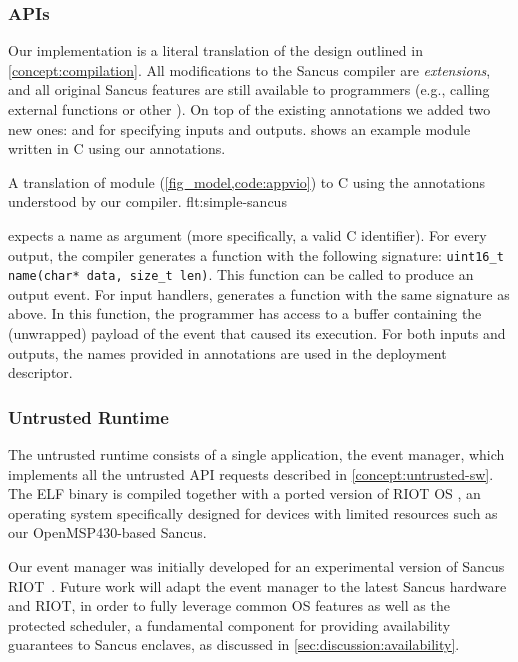 \subsubsection{APIs}
% 
\label{impl:sancus-CompilerAndAPIs}

Our implementation is a literal translation of the design outlined in
\cref{concept:compilation}. All modifications to the Sancus compiler are
\emph{extensions}, and all original Sancus features are still available to
programmers (e.g., calling external functions or other \protmods).
%
On top of the existing annotations we added two new ones: \sminput{} and
\smoutput{} for specifying inputs and outputs.  shows an
example module written in C using our annotations.

%
  {A translation of module  (\cref{fig_model,code:appvio}) to C
using the annotations understood by our compiler.}%
  {flt:simple-sancus}

\smoutput{} expects a name as argument (more specifically, a valid C
identifier).  For every output, the compiler generates a function with the
following signature: \texttt{uint16\_t name(char* data, size\_t len)}.  This
function can be called to produce an output event.  For input handlers,
\sminput{} generates a function with the same signature as above.  In this
function, the programmer has access to a buffer containing the (unwrapped)
payload of the event that caused its execution.  For both inputs and outputs,
the names provided in annotations are used in the deployment descriptor.

\subsubsection{Untrusted Runtime}
%
The untrusted runtime consists of a single application, the event manager, which
implements all the untrusted API requests described in
\cref{concept:untrusted-sw}. The ELF binary is compiled together with a ported
version of RIOT OS \cite{baccelli2013riot}, an operating system specifically
designed for devices with limited resources such as our OpenMSP430-based Sancus.

Our event manager was initially developed for an experimental version
of Sancus RIOT~\cite{alder_2021_aion}. Future work will
adapt the event manager to the latest Sancus hardware and RIOT, in order to
fully leverage common OS features as well as the protected scheduler, a
fundamental component for providing availability guarantees to Sancus enclaves,
as discussed in \ref{sec:discussion:availability}.

